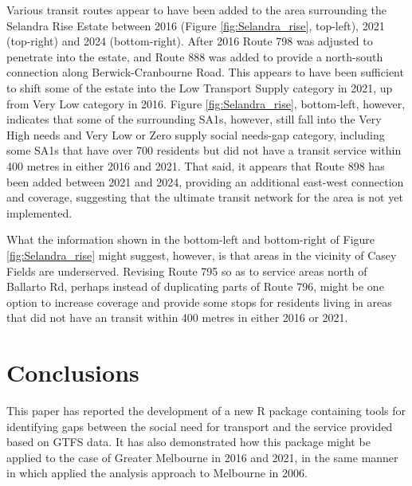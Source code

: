 \documentclass[preprint, 3p,
authoryear]{elsarticle} %
\begin{document}
Various transit routes appear to have been added to the area surrounding
the Selandra Rise Estate between 2016 (Figure \ref{fig:Selandra_rise},
top-left), 2021 (top-right) and 2024 (bottom-right). After 2016 Route
798 was adjusted to penetrate into the estate, and Route 888 was added
to provide a north-south connection along Berwick-Cranbourne Road. This
appears to have been sufficient to shift some of the estate into the Low
Transport Supply category in 2021, up from Very Low category in 2016.
Figure \ref{fig:Selandra_rise}, bottom-left, however, indicates that
some of the surrounding SA1s, however, still fall into the Very High
needs and Very Low or Zero supply social needs-gap category, including
some SA1s that have over 700 residents but did not have a transit
service within 400 metres in either 2016 and 2021. That said, it appears
that Route 898 has been added between 2021 and 2024, providing an
additional east-west connection and coverage, suggesting that the
ultimate transit network for the area is not yet implemented.

What the information shown in the bottom-left and bottom-right of Figure
\ref{fig:Selandra_rise} might suggest, however, is that areas in the
vicinity of Casey Fields are underserved. Revising Route 795 so as to
service areas north of Ballarto Rd, perhaps instead of duplicating parts
of Route 796, might be one option to increase coverage and provide some
stops for residents living in areas that did not have an transit within
400 metres in either 2016 or 2021.

\section{Conclusions}\label{conclusions}

This paper has reported the development of a new R package containing
tools for identifying gaps between the social need for transport and the
service provided based on GTFS data. It has also demonstrated how this
package might be applied to the case of Greater Melbourne in 2016 and
2021, in the same manner in which \citet{currie2010identifying} applied
the analysis approach to Melbourne in 2006.
\end{document}
